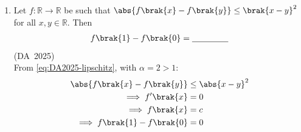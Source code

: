 \begin{enumerate}[label=\thesubsection.\arabic*, ref=\thesubsection.\theenumi]
\begin{enumerate}
\end{enumerate}
\solution
From \eqref{eq:DA2025-triangle_ineq}, the shortest path distances given by the three paths of length $3$ are $d\brak{a, d} = 3$, $d\brak{e, h} = 3$, and $d\brak{a, h} = 3$:
\begin{align}
	d\brak{u, v} &\le d\brak{u, w} + d\brak{w, v}
\end{align}
\begin{itemize}
	\item If edge $\brak{b, d}$ exists, the path $a-b-d$ gives:
	\begin{align}
		d\brak{a, d} \le d\brak{a, b} + d\brak{b, d} = 1 + 1 = 2 < 3
	\end{align}
	contradicting that $a-b-c-d$ is a shortest path.
	\item If edge $\brak{b, h}$ exists, the path $a-b-h$ gives:
	\begin{align}
		d\brak{a, h} \le d\brak{a, b} + d\brak{b, h} = 1 + 1 = 2 < 3
	\end{align}
	contradicting that $a-f-c-h$ is a shortest path.
	\item If edge $\brak{e, g}$ exists, the path $e-g-h$ gives:
	\begin{align}
		d\brak{e, h} \le d\brak{e, g} + d\brak{g, h} = 1 + 1 = 2 < 3
	\end{align}
	contradicting that $e-f-g-h$ is a shortest path.
\end{itemize}
$\therefore \brak{b, d}$, $\brak{b, h}$, and $\brak{e, g}$ are not edges of $G$.

If edge $\brak{b, g}$ exists, the shortest paths using $\brak{b, g}$ between the given pairs are $a-b-g-h$ (length $3$), $a-b-c-d$ (length $3$), and $e-f-g-h$ (length $3$)- None of the shortest-path distances $d\brak{a, d} = 3$, $d\brak{e, h} = 3$, or $d\brak{a, h} = 3$ are reduced below $3$.
\\
 $\therefore \brak{b, g}$ can be an edge of $G$.
	\item 
	Let $f: \mathbb{R} \to \mathbb{R}$ be such that $\abs{f\brak{x} - f\brak{y}} \le \brak{x - y}^2$ for all $x, y \in \mathbb{R}$. Then
	\begin{align}
		f\brak{1} - f\brak{0} = \underline{\hspace{1.5cm}}
	\end{align}
	\hfill (DA~2025)
	\\
	\solution
	From \eqref{eq:DA2025-lipschitz}, with $\alpha = 2 > 1$:
	\begin{align}
		\abs{f\brak{x} - f\brak{y}} &\le \abs{x - y}^2
		\\
		\implies f'\brak{x} &= 0
		\\
		\implies f\brak{x} &= c
		\\
		\implies f\brak{1} - f\brak{0} &= 0
	\end{align}
	

\end{enumerate}
